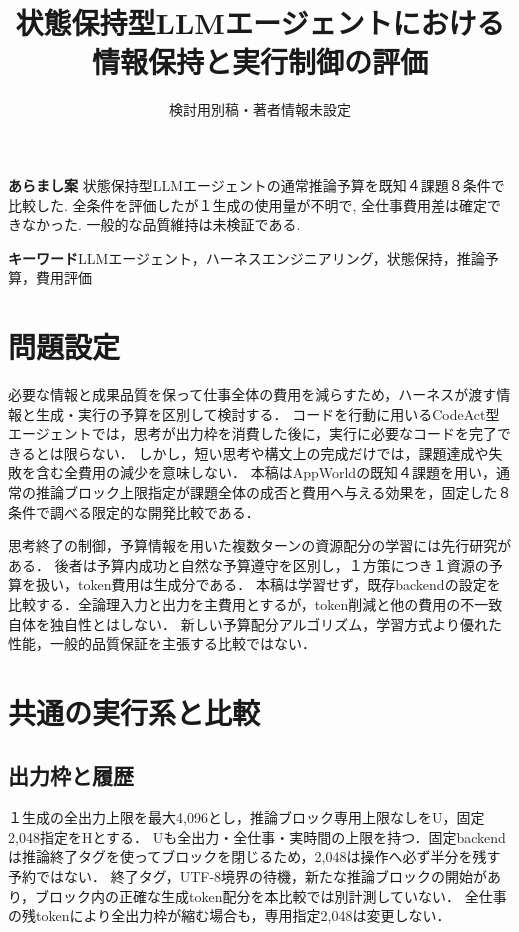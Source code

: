 \documentclass[uplatex,a4paper,twocolumn,10pt]{jsarticle}
\title{状態保持型LLMエージェントにおける\newline 情報保持と実行制御の評価}
\author{検討用別稿・著者情報未設定}
\date{}
\begin{document}
\raggedbottom
\maketitle
\noindent\textbf{あらまし案}\quad
状態保持型LLMエージェントの通常推論予算を既知４課題８条件で比較した. 全条件を評価したが１生成の使用量が不明で, 全仕事費用差は確定できなかった. 一般的な品質維持は未検証である.

\noindent\textbf{キーワード}\quad LLMエージェント，ハーネスエンジニアリング，状態保持，推論予算，費用評価

\section{問題設定}
必要な情報と成果品質を保って仕事全体の費用を減らすため，ハーネスが渡す情報と生成・実行の予算を区別して検討する．
コードを行動に用いるCodeAct\cite{codeact}型エージェントでは，思考が出力枠を消費した後に，実行に必要なコードを完了できるとは限らない．
しかし，短い思考や構文上の完成だけでは，課題達成や失敗を含む全費用の減少を意味しない．
本稿はAppWorld\cite{appworld}の既知４課題を用い，通常の推論ブロック上限指定が課題全体の成否と費用へ与える効果を，固定した８条件で調べる限定的な開発比較である．

思考終了の制御\cite{s1}，予算情報を用いた複数ターンの資源配分の学習\cite{budgettraining}には先行研究がある．
後者は予算内成功と自然な予算遵守を区別し，１方策につき１資源の予算を扱い，token費用は生成分である．
本稿は学習せず，既存backendの設定\cite{backend}を比較する．全論理入力と出力を主費用とするが，token削減と他の費用の不一致\cite{costproxy}自体を独自性とはしない．
新しい予算配分アルゴリズム，学習方式より優れた性能，一般的品質保証を主張する比較ではない．

\section{共通の実行系と比較}
\subsection{出力枠と履歴}
１生成の全出力上限を最大4,096とし，推論ブロック専用上限なしをU，固定2,048指定をHとする．
Uも全出力・全仕事・実時間の上限を持つ．固定backendは推論終了タグを使ってブロックを閉じるため，2,048は操作へ必ず半分を残す予約ではない．
終了タグ，UTF-8境界の待機，新たな推論ブロックの開始があり，ブロック内の正確な生成token配分を本比較では別計測していない．
全仕事の残tokenにより全出力枠が縮む場合も，専用指定2,048は変更しない．
\end{document}
